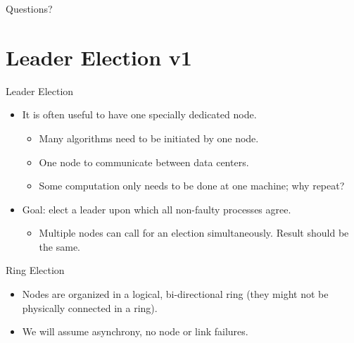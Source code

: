 \documentclass[aspectratio=169]{beamer}
\begin{document}
\begin{frame}{}
      \begin{center}
    {\color{sigma@mainblue} \LARGE Questions?}
  \end{center}
\end{frame}


\section{Leader Election v1}
\frame{\sectionpage}

\begin{frame}{Leader Election}
    \begin{itemize}
        \item It is often useful to have one specially dedicated node.\pause
        \begin{itemize}
            \item Many algorithms need to be initiated by one node.\pause
            \item One node to communicate between data centers.\pause
            \item Some computation only needs to be done at one machine; why repeat?\pause
        \end{itemize}
        \item Goal: elect a leader upon which all non-faulty processes agree.
        \begin{itemize}
            \item Multiple nodes can call for an election simultaneously. Result should be the same.
        \end{itemize}
    \end{itemize}
\end{frame}


\begin{frame}{Ring Election}
    \begin{itemize}
        \item Nodes are organized in a logical, bi-directional ring (they might not be physically connected in a ring).
    \end{itemize}
    \begin{center}
    \end{center}
    \begin{itemize}
        \item We will assume asynchrony, no node or link failures.
    \end{itemize}
\end{frame}
\end{document}
